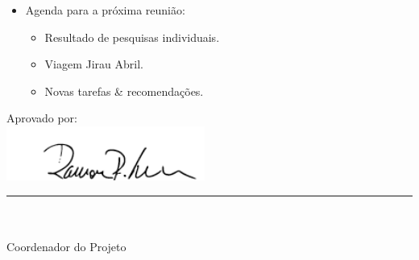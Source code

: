 \begin{itemize}
\begin{itemize}
			
  \end{itemize}


  \item Agenda para a próxima reunião:
  \begin{itemize}
    \item Resultado de pesquisas individuais.
    \item Viagem Jirau Abril.
    \item Novas tarefas \& recomendações.
  \end{itemize}

\end{itemize}

\vspace{5mm}%
\parbox[t]{70mm}{
  Aprovado por: \\[5mm]
  \centering
  \includegraphics[width=65mm]{figs/logo/assinatura-ramon.png} \\[-4mm]
  \rule[2mm]{70mm}{0.1mm} \\
  \ramon \\[1mm]
  Coordenador do Projeto \\
}

\fim